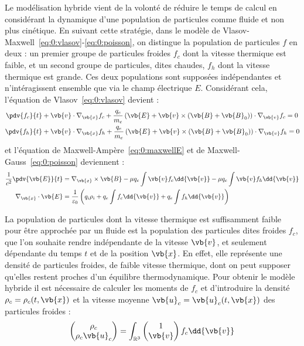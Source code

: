 Le modélisation hybride vient de la volonté de réduire le temps de calcul en considérant la dynamique d'une population de particules comme fluide et non plus cinétique. En suivant cette stratégie, dans le modèle de Vlasov-Maxwell~\eqref{eq:0:vlasov}-\eqref{eq:0:poisson}, on distingue la population de particules $f$ en deux : un premier groupe de particules froides $f_c$ dont la vitesse thermique est faible, et un second groupe de particules, dites chaudes, $f_h$ dont la vitesse thermique est grande. Ces deux populations sont supposées indépendantes et n'intéragissent ensemble que via le champ électrique $E$. Considérant cela, l'équation de Vlasov~\eqref{eq:0:vlasov} devient :
$$
  \begin{aligned}
    \pdv{f_c}{t} &+ \vb{v}\cdot\nabla_{\vb{x}} f_c + \frac{q_e}{m_e}\left( \vb{E} + \vb{v}\times(\vb{B}+\vb{B}_0) \right)\cdot\nabla_{\vb{v}} f_c = 0 \\
    \pdv{f_h}{t} &+ \vb{v}\cdot\nabla_{\vb{x}} f_h + \frac{q_e}{m_e}\left( \vb{E} + \vb{v}\times(\vb{B}+\vb{B}_0) \right)\cdot\nabla_{\vb{v}} f_h = 0
  \end{aligned}
$$
et l'équation de Maxwell-Ampère~\eqref{eq:0:maxwellE} et de Maxwell-Gauss~\eqref{eq:0:poisson} deviennent :
$$
  \begin{aligned}
    \frac{1}{c^2}\pdv{\vb{E}}{t} &= \nabla_{\vb{x}}\times \vb{B} - \mu q_e\int \vb{v} f_c\dd{\vb{v}} - \mu q_e\int \vb{v} f_h\dd{\vb{v}} \\
    \nabla_{\vb{x}}\cdot\vb{E} &= \frac{1}{\varepsilon_0}\left( q_i\rho_i + q_e\int f_c\dd{\vb{v}} + q_e\int f_h\dd{\vb{v}} \right)
  \end{aligned}
$$

La population de particules dont la vitesse thermique est suffisamment faible pour être approchée par un fluide est la population des particules dites froides $f_c$, que l'on souhaite rendre indépendante de la vitesse $\vb{v}$, et seulement dépendante du temps $t$ et de la position $\vb{x}$. En effet, elle représente une densité de particules froides, de faible vitesse thermique, dont on peut supposer qu'elles restent proches d'un équilibre thermodynamique. Pour obtenir le modèle hybride il est nécessaire de calculer les moments de $f_c$ et d'introduire la densité $\rho_c=\rho_c(t,\vb{x})$ et la vitesse moyenne $\vb{u}_c=\vb{u}_c(t,\vb{x})$ des particules froides :
$$
  \begin{pmatrix}
    \rho_c \\
    \rho_c \vb{u}_c
  \end{pmatrix}
  =
  \int_{\mathbb{R}^3} \begin{pmatrix}
    1 \\
    \vb{v}
  \end{pmatrix} f_c\dd{\vb{v}}
$$


